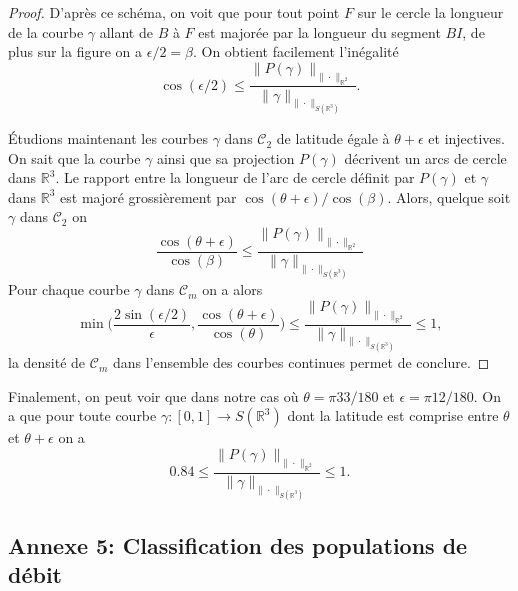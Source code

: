 \documentclass[a4paper,11pt]{article}
\numberwithin{equation}{section}
\begin{document}
\begin{proof}
D'après ce schéma, on voit que pour tout point $F$ sur le cercle la longueur de la courbe $\gamma$ allant de $B$ à $F$  est majorée par la longueur du segment $BI$, de plus sur la figure  on a $\epsilon/2=\beta$. On obtient facilement l'inégalité
\[\cos(\epsilon/2)\leq\frac{\|P(\gamma)\|_{\|\cdot\|_{\mathbb{R}^2}}}{\|\gamma\|_{\|\cdot\|_{S(\mathbb{R}^3)}}}.\]
	
Étudions maintenant les courbes $\gamma$ dans $\mathcal{C}_2$ de latitude égale à $\theta+\epsilon$ et injectives. On sait que la courbe $\gamma$ ainsi que sa projection $P(\gamma)$ décrivent un arcs de cercle dans $\mathbb{R}^3$. Le rapport entre la longueur de l'arc de cercle définit par $P(\gamma)$ et $\gamma$ dans $\mathbb{R}^3$ est majoré grossièrement par $\cos(\theta+\epsilon)/\cos(\beta)$. Alors, quelque soit $\gamma$ dans $\mathcal{C}_2$ on
\[\frac{\cos(\theta+\epsilon)}{\cos(\beta)}\leq\frac{\|P(\gamma)\|_{\|\cdot\|_{\mathbb{R}^2}}}{\|\gamma\|_{\|\cdot\|_{S(\mathbb{R}^3)}}}\]
Pour chaque courbe $\gamma$ dans $\mathcal{C}_m$ on a alors 
\[\min\Big(\frac{2\sin(\epsilon/2)}{\epsilon},\frac{\cos(\theta+\epsilon)}{\cos(\theta)} \Big)\leq \frac{\|P(\gamma)\|_{\|\cdot\|_{\mathbb{R}^2}}}{\|\gamma\|_{\|\cdot\|_{S(\mathbb{R}^3)}}} \leq 1,\]
la densité de $\mathcal{C}_m$ dans l'ensemble des courbes continues permet de conclure.
\end{proof}

Finalement, on peut voir que dans notre cas où $\theta=\pi 33/180$ et $\epsilon=\pi 12/180$. On a que pour toute courbe $\gamma:[0,1]\to S(\mathbb{R}^3)$ dont la latitude est comprise entre $\theta$ et $\theta+\epsilon$ on a
\[0.84\leq \frac{\|P(\gamma)\|_{\|\cdot\|_{\mathbb{R}^2}}}{\|\gamma\|_{\|\cdot\|_{S(\mathbb{R}^3)}}} \leq 1.\]


\subsection{Annexe 5: Classification des populations de débit}
\label{indexe3:cl_deb}
\end{document}
